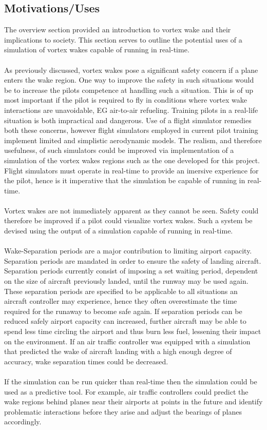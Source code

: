 \subsection{Motivations/Uses}
The overview section provided an introduction to vortex wake and their implications to society. This section serves to outline the potential uses of a simulation of vortex wakes capable of running in real-time.
\\\\
As previously discussed, vortex wakes pose a significant safety concern if a plane enters the wake region. One way to improve the safety in such situations would be to increase the pilots competence at handling such a situation. This is of up most important if the pilot is required to fly in conditions where vortex wake interactions are unavoidable, EG air-to-air refueling. Training pilots in a real-life situation is both impractical and dangerous. Use of a flight simulator remedies both these concerns, however flight simulators employed in current pilot training implement limited and simplistic aerodynamic models. The realism, and therefore usefulness, of such simulators could be improved via implementation of a simulation of the vortex wakes regions such as the one developed for this project. Flight simulators must operate in real-time to provide an imersive experience for the pilot, hence is it imperative that the simulation be capable of running in real-time.
\\\\
Vortex wakes are not immediately apparent as they cannot be seen. Safety could therefore be improved if a pilot could visualize vortex wakes. Such a system be devised using the output of a simulation capable of running in real-time. 
\\\\
Wake-Separation periods are a major contribution to limiting airport capacity. Separation periods are mandated in order to ensure the safety of landing aircraft. Separation periods currently consist of imposing a set waiting period, dependent on the size of aircraft previously landed, until the runway may be used again. These separation periods are specified to be applicable to all situations an aircraft controller may experience, hence they often overestimate the time required for the runaway to become safe again. If separation periods can be reduced safely airport capacity can increased, further aircraft may be able to spend less time circling the airport and thus burn less fuel, lessening their impact on the environment. If an air traffic controller was equipped with a simulation that predicted the wake of aircraft landing with a high enough degree of accuracy, wake separation times could be decreased.
\\\\
If the simulation can be run quicker than real-time then the simulation could be used as a predictive tool. For example, air traffic controllers could predict the wake regions behind planes near their airports at points in the future and identify problematic interactions before they arise and adjust the bearings of planes accordingly.

